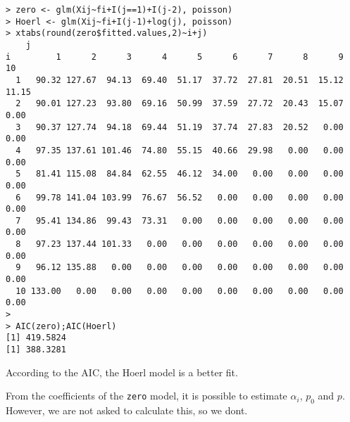 \documentclass[11pt]{article}
\begin{document}
\begin{verbatim}
> zero <- glm(Xij~fi+I(j==1)+I(j-2), poisson)
> Hoerl <- glm(Xij~fi+I(j-1)+log(j), poisson)
> xtabs(round(zero$fitted.values,2)~i+j)
    j
i         1      2      3      4      5      6      7      8      9     10
  1   90.32 127.67  94.13  69.40  51.17  37.72  27.81  20.51  15.12  11.15
  2   90.01 127.23  93.80  69.16  50.99  37.59  27.72  20.43  15.07   0.00
  3   90.37 127.74  94.18  69.44  51.19  37.74  27.83  20.52   0.00   0.00
  4   97.35 137.61 101.46  74.80  55.15  40.66  29.98   0.00   0.00   0.00
  5   81.41 115.08  84.84  62.55  46.12  34.00   0.00   0.00   0.00   0.00
  6   99.78 141.04 103.99  76.67  56.52   0.00   0.00   0.00   0.00   0.00
  7   95.41 134.86  99.43  73.31   0.00   0.00   0.00   0.00   0.00   0.00
  8   97.23 137.44 101.33   0.00   0.00   0.00   0.00   0.00   0.00   0.00
  9   96.12 135.88   0.00   0.00   0.00   0.00   0.00   0.00   0.00   0.00
  10 133.00   0.00   0.00   0.00   0.00   0.00   0.00   0.00   0.00   0.00
> 
> AIC(zero);AIC(Hoerl)
[1] 419.5824
[1] 388.3281
\end{verbatim}

According to the AIC, the Hoerl model is a better fit.

From the coefficients of the \verb|zero| model, it is possible to estimate $\alpha_{i}$, $p_{0}$ and $p$. However, we are not asked to calculate this, so we dont.
\end{document}
